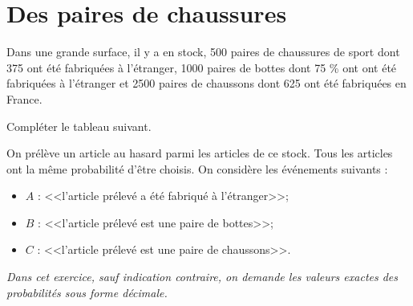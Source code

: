 \section{Des paires de chaussures}

Dans une grande surface, il y a en stock, 500 paires de chaussures de sport dont 375 ont été fabriquées à l'étranger, 1000 paires de bottes dont 75 \% ont ont été fabriquées à l'étranger et 2500 paires de chaussons dont 625 ont été fabriquées en France.


\begin{questions}
	\question[2] Compléter le tableau suivant.
	
	
	
	\begin{solution}
		
	\end{solution}
	\vspace*{0.2cm}
	\question[5] On prélève un article au hasard parmi les articles de ce stock. Tous les articles ont la même probabilité d'être choisis. On considère les événements suivants :
	
	\begin{itemize}
		\item $A$ : <<l'article prélevé a été fabriqué à l'étranger>>;
		\item $B$ : <<l'article prélevé est une paire de bottes>>;
		\item $C$ : <<l'article prélevé est une paire de chaussons>>.
	\end{itemize}

\emph{Dans cet exercice, sauf indication contraire, on demande les valeurs exactes des probabilités sous forme décimale.}

\end{questions}
